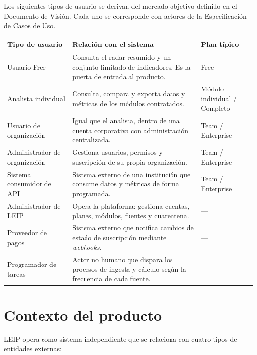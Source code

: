 \documentclass[11pt,a4paper]{article}
\newcommand{\proyectoNombre}{LEIP}
\begin{document}
Los siguientes tipos de usuario se derivan del mercado objetivo definido en el
Documento de Visi\'on. Cada uno se corresponde con actores de la Especificaci\'on
de Casos de Uso.

\begin{tabularx}{\textwidth}{l X l}
\toprule
\textbf{Tipo de usuario} & \textbf{Relaci\'on con el sistema} & \textbf{Plan t\'ipico} \\
\midrule
Usuario Free & Consulta el radar resumido y un conjunto limitado de indicadores. Es la puerta de entrada al producto. & Free \\
\addlinespace
Analista individual & Consulta, compara y exporta datos y m\'etricas de los m\'odulos contratados. & M\'odulo individual / Completo \\
\addlinespace
Usuario de organizaci\'on & Igual que el analista, dentro de una cuenta corporativa con administraci\'on centralizada. & Team / Enterprise \\
\addlinespace
Administrador de organizaci\'on & Gestiona usuarios, permisos y suscripci\'on de su propia organizaci\'on. & Team / Enterprise \\
\addlinespace
Sistema consumidor de API & Sistema externo de una instituci\'on que consume datos y m\'etricas de forma programada. & Team / Enterprise \\
\addlinespace
Administrador de \proyectoNombre{} & Opera la plataforma: gestiona cuentas, planes, m\'odulos, fuentes y cuarentena. & --- \\
\addlinespace
Proveedor de pagos & Sistema externo que notifica cambios de estado de suscripci\'on mediante \emph{webhooks}. & --- \\
\addlinespace
Programador de tareas & Actor no humano que dispara los procesos de ingesta y c\'alculo seg\'un la frecuencia de cada fuente. & --- \\
\bottomrule
\end{tabularx}

\section{Contexto del producto}

\proyectoNombre{} opera como sistema independiente que se relaciona con cuatro
tipos de entidades externas:
\end{document}
